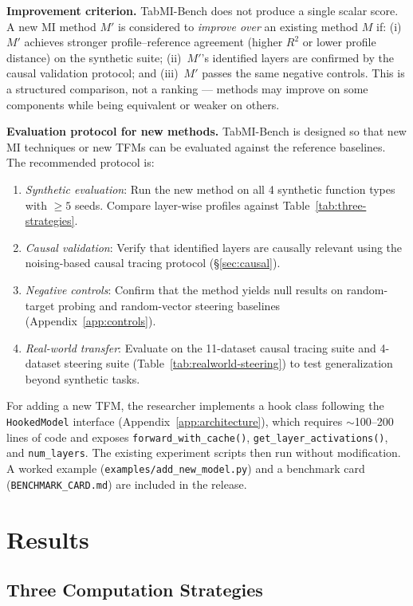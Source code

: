 \documentclass{article}
\begin{document}
\textbf{Improvement criterion.} TabMI-Bench does not produce a single scalar score. A new MI method $M'$ is considered to \textit{improve over} an existing method $M$ if: (i)~$M'$ achieves stronger profile--reference agreement (higher $R^2$ or lower profile distance) on the synthetic suite; (ii)~$M'$'s identified layers are confirmed by the causal validation protocol; and (iii)~$M'$ passes the same negative controls. This is a structured comparison, not a ranking --- methods may improve on some components while being equivalent or weaker on others.

\textbf{Evaluation protocol for new methods.} TabMI-Bench is designed so that new MI techniques or new TFMs can be evaluated against the reference baselines. The recommended protocol is:
\begin{enumerate}[nosep,leftmargin=*]
\item \textit{Synthetic evaluation}: Run the new method on all 4 synthetic function types with $\geq 5$ seeds. Compare layer-wise profiles against Table~\ref{tab:three-strategies}.
\item \textit{Causal validation}: Verify that identified layers are causally relevant using the noising-based causal tracing protocol (\S\ref{sec:causal}).
\item \textit{Negative controls}: Confirm that the method yields null results on random-target probing and random-vector steering baselines (Appendix~\ref{app:controls}).
\item \textit{Real-world transfer}: Evaluate on the 11-dataset causal tracing suite and 4-dataset steering suite (Table~\ref{tab:realworld-steering}) to test generalization beyond synthetic tasks.
\end{enumerate}
For adding a new TFM, the researcher implements a hook class following the \texttt{HookedModel} interface (Appendix~\ref{app:architecture}), which requires $\sim$100--200 lines of code and exposes \texttt{forward\_with\_cache()}, \texttt{get\_layer\_activations()}, and \texttt{num\_layers}. The existing experiment scripts then run without modification. A worked example (\texttt{examples/add\_new\_model.py}) and a benchmark card (\texttt{BENCHMARK\_CARD.md}) are included in the release.

\section{Results}

\subsection{Three Computation Strategies}
\label{sec:strategies}
\end{document}
